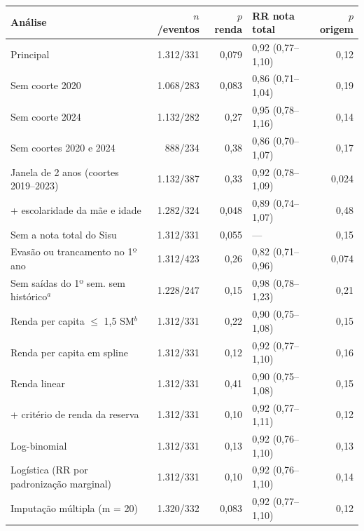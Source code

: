 \begin{tabular}{lrrlr}
\toprule
Análise & $n$/eventos & $p$ renda & RR nota total & $p$ origem \\
\midrule
Principal & 1.312/331 & 0,079 & 0,92 (0,77--1,10) & 0,12 \\
Sem coorte 2020 & 1.068/283 & 0,083 & 0,86 (0,71--1,04) & 0,19 \\
Sem coorte 2024 & 1.132/282 & 0,27 & 0,95 (0,78--1,16) & 0,14 \\
Sem coortes 2020 e 2024 & 888/234 & 0,38 & 0,86 (0,70--1,07) & 0,17 \\
Janela de 2 anos (coortes 2019--2023) & 1.132/387 & 0,33 & 0,92 (0,78--1,09) & 0,024 \\
+ escolaridade da mãe e idade & 1.282/324 & 0,048 & 0,89 (0,74--1,07) & 0,48 \\
Sem a nota total do Sisu & 1.312/331 & 0,055 & --- & 0,15 \\
Evasão ou trancamento no 1º ano & 1.312/423 & 0,26 & 0,82 (0,71--0,96) & 0,074 \\
Sem saídas do 1º sem. sem histórico$^{a}$ & 1.228/247 & 0,15 & 0,98 (0,78--1,23) & 0,21 \\
Renda per capita $\leq$ 1,5 SM$^{b}$ & 1.312/331 & 0,22 & 0,90 (0,75--1,08) & 0,15 \\
Renda per capita em spline & 1.312/331 & 0,12 & 0,92 (0,77--1,10) & 0,16 \\
Renda linear & 1.312/331 & 0,41 & 0,90 (0,75--1,08) & 0,15 \\
+ critério de renda da reserva & 1.312/331 & 0,10 & 0,92 (0,77--1,11) & 0,12 \\
Log-binomial & 1.312/331 & 0,13 & 0,92 (0,76--1,10) & 0,13 \\
Logística (RR por padronização marginal) & 1.312/331 & 0,10 & 0,92 (0,76--1,10) & 0,14 \\
Imputação múltipla (m = 20) & 1.320/332 & 0,083 & 0,92 (0,77--1,10) & 0,12 \\
\bottomrule
\end{tabular}
